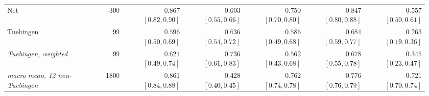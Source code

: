 {\begin{tabular}{l r rrrrr}
Net & 300 & $0.867$ {\tiny$[0.82,0.90]$} & $0.603$ {\tiny$[0.55,0.66]$} & $0.750$ {\tiny$[0.70,0.80]$} & $0.847$ {\tiny$[0.80,0.88]$} & $0.557$ {\tiny$[0.50,0.61]$}\\
Tuebingen & 99 & $0.596$ {\tiny$[0.50,0.69]$} & $0.636$ {\tiny$[0.54,0.72]$} & $0.586$ {\tiny$[0.49,0.68]$} & $0.684$ {\tiny$[0.59,0.77]$} & $0.263$ {\tiny$[0.19,0.36]$}\\
\midrule
\emph{Tuebingen, weighted} & 99 & $0.621$ {\tiny$[0.49,0.74]$} & $0.736$ {\tiny$[0.61,0.83]$} & $0.562$ {\tiny$[0.43,0.68]$} & $0.678$ {\tiny$[0.55,0.78]$} & $0.345$ {\tiny$[0.23,0.47]$}\\
\midrule
\emph{macro mean, 12 non-Tuebingen} & 1800 & $0.861$ {\tiny$[0.84,0.88]$} & $0.428$ {\tiny$[0.40,0.45]$} & $0.762$ {\tiny$[0.74,0.78]$} & $0.776$ {\tiny$[0.76,0.79]$} & $0.721$ {\tiny$[0.70,0.74]$}\\
\bottomrule
\end{tabular}}
